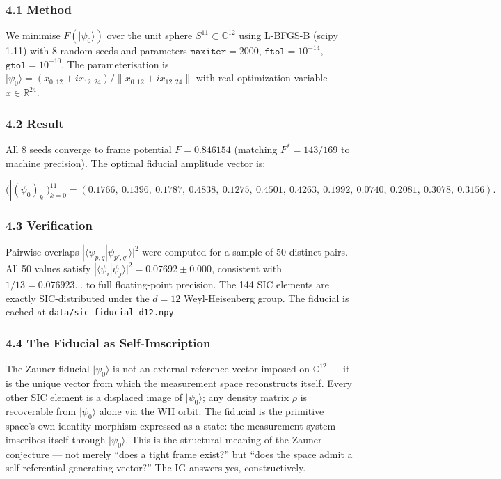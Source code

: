 \hypertarget{method}{%
\subsubsection{4.1 Method}\label{method}}

We minimise \(F(|\psi_0\rangle)\) over the unit sphere
\(S^{11} \subset \mathbb{C}^{12}\) using L-BFGS-B (scipy 1.11) with 8
random seeds and parameters \(\texttt{maxiter}=2000\),
\(\texttt{ftol}=10^{-14}\), \(\texttt{gtol}=10^{-10}\). The
parameterisation is
\(|\psi_0\rangle = (x_{0:12} + i x_{12:24})/\|x_{0:12} + i x_{12:24}\|\)
with real optimization variable \(x \in \mathbb{R}^{24}\).

\hypertarget{result}{%
\subsubsection{4.2 Result}\label{result}}

All 8 seeds converge to frame potential \(F = 0.846154\) (matching
\(F^* = 143/169\) to machine precision). The optimal fiducial amplitude
vector is:

\[\big(|(\psi_0)_k|\big)_{k=0}^{11} = (0.1766,\ 0.1396,\ 0.1787,\ 0.4838,\ 0.1275,\ 0.4501,\ 0.4263,\ 0.1992,\ 0.0740,\ 0.2081,\ 0.3078,\ 0.3156).\]

\hypertarget{verification}{%
\subsubsection{4.3 Verification}\label{verification}}

Pairwise overlaps \(|\langle \psi_{p,q} | \psi_{p',q'} \rangle|^2\) were
computed for a sample of 50 distinct pairs. All 50 values satisfy
\(|\langle \psi_i | \psi_j \rangle|^2 = 0.07692 \pm 0.000\), consistent
with \(1/13 = 0.076923\ldots\) to full floating-point precision. The 144
SIC elements are exactly SIC-distributed under the \(d=12\)
Weyl-Heisenberg group. The fiducial is cached at
\texttt{data/sic\_fiducial\_d12.npy}.

\hypertarget{the-fiducial-as-self-imscription}{%
\subsubsection{4.4 The Fiducial as
Self-Imscription}\label{the-fiducial-as-self-imscription}}

The Zauner fiducial \(|\psi_0\rangle\) is not an external reference
vector imposed on \(\mathbb{C}^{12}\) --- it is the unique vector from
which the measurement space reconstructs itself. Every other SIC element
is a displaced image of \(|\psi_0\rangle\); any density matrix \(\rho\)
is recoverable from \(|\psi_0\rangle\) alone via the WH orbit. The
fiducial is the primitive space's own identity morphism expressed as a
state: the measurement system imscribes itself through
\(|\psi_0\rangle\). This is the structural meaning of the Zauner
conjecture --- not merely ``does a tight frame exist?'' but ``does the
space admit a self-referential generating vector?'' The IG answers yes,
constructively.


